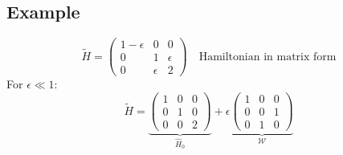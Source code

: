 \documentclass[12pt,fancychapters]{report}
\numberwithin{equation}{section}
\begin{document}
\subsection*{Example}
\[
  \tilde{H} = 
  \begin{pmatrix}
  1-\epsilon & 0 & 0\\
  0 & 1 & \epsilon\\
  0 & \epsilon & 2
\end{pmatrix}\quad \text{Hamiltonian in matrix form}
\]
For $\epsilon \ll 1$:
\[
  \tilde{H} = 
  \underbrace{\begin{pmatrix}
  1 & 0 & 0\\
  0 & 1 & 0\\
  0 & 0 & 2
\end{pmatrix}}_{\hat{H}_0} + \epsilon 
  \underbrace{\begin{pmatrix}
  1 & 0 & 0\\
  0 & 0 & 1\\
  0 & 1 & 0
\end{pmatrix}}_{\mathcal{W}}
\]
\end{document}
